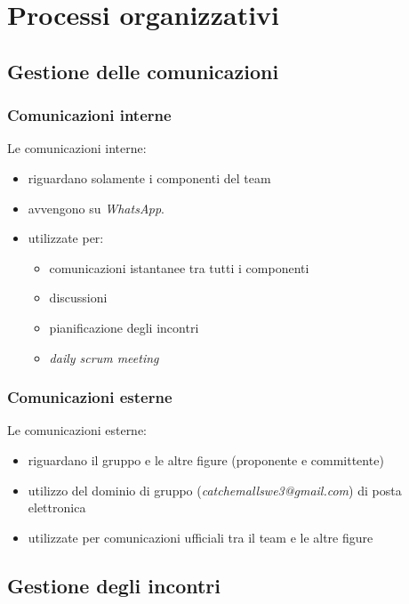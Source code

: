 \section{Processi organizzativi}
    \subsection{Gestione delle comunicazioni}
        \subsubsection{Comunicazioni interne}
        Le comunicazioni interne:
        \begin{itemize}
            \item riguardano solamente i componenti del team 
            \item avvengono su \textit{WhatsApp}.
            \item utilizzate per:
                \begin{itemize}
                    \item comunicazioni istantanee tra tutti i componenti
                    \item discussioni
                    \item pianificazione degli incontri
                    \item \textit{daily scrum meeting} 
                \end{itemize}
        \end{itemize}
            
        \subsubsection{Comunicazioni esterne}
        Le comunicazioni esterne:
        \begin{itemize}
            \item riguardano il gruppo e le altre figure (proponente e committente)
            \item utilizzo del dominio di gruppo (\textit{catchemallswe3@gmail.com}) di posta elettronica
            \item utilizzate per comunicazioni ufficiali tra il team e le altre figure
        \end{itemize}

        
        
    \subsection{Gestione degli incontri}
